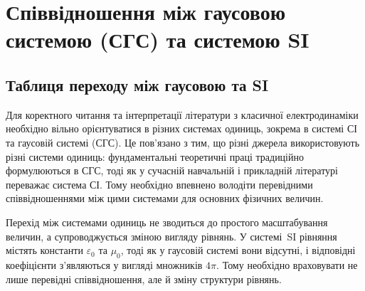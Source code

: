 \documentclass{ConspectBook}
\begin{document}
\pagestyle{plain}
\chapter{Співвідношення між гаусовою системою (СГС) та системою SI}\label{\currfilebase}

\section{Таблиця переходу між гаусовою та SI}

Для коректного читання та інтерпретації літератури з класичної електродинаміки необхідно вільно орієнтуватися в різних системах одиниць, зокрема в системі СІ та гаусовій системі (СГС). Це пов’язано з тим, що різні джерела використовують різні системи одиниць: фундаментальні теоретичні праці традиційно формулюються в СГС, тоді як у сучасній навчальній і прикладній літературі переважає система СІ. Тому необхідно впевнено володіти перевідними співвідношеннями між цими системами для основних фізичних величин.

Перехід між системами одиниць не зводиться до простого масштабування величин, а супроводжується зміною вигляду рівнянь. У системі~SI рівняння містять константи \(\varepsilon_0\) та \(\mu_0\), тоді як у гаусовій системі вони відсутні, і відповідні коефіцієнти з’являються у вигляді множників \(4\pi\). Тому необхідно враховувати не лише перевідні співвідношення, але й зміну структури рівнянь.
\end{document}
